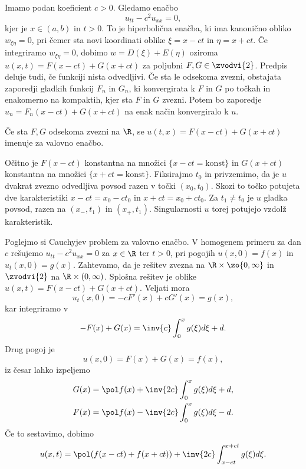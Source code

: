 
Imamo podan koeficient $c > 0$.
Gledamo enačbo
\[
  u_{tt} - c^2 u_{xx} = 0,
\]
kjer je $x \in (a,b)$ in $t > 0$.
To je hiperbolična enačba, ki ima kanonično obliko $w_{\xi \eta} = 0$, pri čemer
sta novi koordinati oblike $\xi = x - ct$ in $\eta = x + ct$.
Če integriramo $w_{\xi \eta} = 0$, dobimo $w = D(\xi) + E(\eta)$ oziroma $u(x,
t) = F(x - ct) + G(x + ct)$ za poljubni $F, G \in \zvodvi{2}$.
Predpis deluje tudi, če funkciji nista odvedljivi.
Če sta le odsekoma zvezni, obstajata zaporedji gladkih funkcij $F_n$ in $G_n$,
ki konvergirata k $F$ in $G$ po točkah in enakomerno na kompaktih, kjer sta $F$
in $G$ zvezni.
Potem bo zaporedje $u_n = F_n(x - ct) + G(x+ct)$ na enak način konvergiralo k
$u$.

\begin{definicija}
  Če sta $F, G$ odsekoma zvezni na $\R$, se $u(t,x) = F(x-ct) + G(x+ct)$ imenuje
   za valovno enačbo.
\end{definicija}


Očitno je $F(x-ct)$ konstantna na množici $\{x-ct = \text{konst}\}$ in $G(x+ct)$
konstantna na množici $\{x+ct = \text{konst}\}$.
Fiksirajmo $t_0$ in privzemimo, da je $u$ dvakrat zvezno odvedljiva povsod razen
v točki $(x_0, t_0)$.
Skozi to točko potujeta dve karakteristiki $x - ct = x_0 - c t_0$ in $x + ct =
x_0 + ct_0$.
Za $t_1 \ne t_0$ je $u$ gladka povsod, razen na $(x_-, t_1)$ in $(x_+, t_1)$.
Singularnosti $u$ torej potujejo vzdolž karakteristik.

Poglejmo si Cauchyjev problem za valovno enačbo.
V homogenem primeru za dan $c$ rešujemo $u_{tt} - c^2 u_{xx} = 0$ za $x \in \R$
ter $t > 0$, pri pogojih $u(x,0) = f(x)$ in $u_t(x,0) = g(x)$.
Zahtevamo, da je rešitev zvezna na $\R\times \zo{0, \infty}$ in $\zvodvi{2}$ na
$\R \times (0, \infty)$.
Splošna rešitev je oblike $u(x,t) = F(x - ct) + G(x + ct)$.
Veljati mora
\[
  u_t(x,0) = -c F'(x) + c G'(x) = g(x),
\]
kar integriramo v
\[
  -F(x) + G(x) = \inv{c} \int_0^x g(\xi) d\xi + d.
\]
Drug pogoj je
\[
  u(x,0) = F(x) + G(x) = f(x),
\]
iz česar lahko izpeljemo
\begin{gather*}
  G(x) = \pol f(x) + \inv{2c} \int_0^x g(\xi) d\xi + d, \\
  F(x) = \pol f(x) - \inv{2c} \int_0^x g(\xi) d\xi - d.
\end{gather*}
Če to sestavimo, dobimo 
\[
  u(x,t) = \pol (f(x-ct) + f(x+ct)) + \inv{2c} \int_{x - ct}^{x + ct} g(\xi)
  d\xi.
\]

